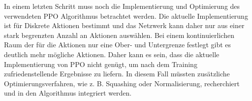 \noindent In einem letzten Schritt muss noch die Implementierung und Optimierung des verwendeten PPO Algorithmus betrachtet werden. Die aktuelle Implementierung ist für Diskrete Aktionen bestimmt und das Netzwerk kann daher nur aus einer stark begrenzten Anzahl an Aktionen auswählen. Bei einem kontinuierlichen Raum der für die Aktionen nur eine Ober- und Untergrenze festlegt gibt es deutlich mehr mögliche Aktionen. Daher kann es sein, dass die aktuelle Implementierung von PPO nicht genügt, um nach dem Training zufriedenstellende Ergebnisse zu liefern. In diesem Fall müssten zusätzliche Optimierungsverfahren, wie z. B. Squashing oder Normalisierung, recherchiert und in den Algorithmus integriert werden.
